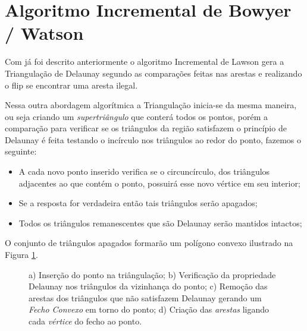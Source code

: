 \documentclass[12pt,a4paper]{book}
\begin{document}
\section{Algoritmo Incremental de Bowyer / Watson}

Com j\'{a} foi descrito anteriormente o algoritmo Incremental de Lawson 
gera a Triangula\c{c}\~{a}o de Delaunay segundo as compara\c{c}\~{o}es 
feitas nas arestas e realizando o flip se encontrar uma aresta ilegal.

Nessa outra abordagem algor\'itmica a Triangula\c{c}\~{a}o inicia-se da mesma maneira, ou seja criando um \textit{supertri\^{a}ngulo} que conter\'{a} todos os pontos, por\'{e}m a compara\c{c}\~{a}o para verificar se os tri\^{a}ngulos da regi\~{a}o satisfazem o princ\'{i}pio de Delaunay \'{e} feita testando o inc\'{i}rculo nos tri\^{a}ngulos ao redor do ponto, fazemos o seguinte: 

\begin{itemize}
\item A cada novo ponto inserido verifica se o circunc\'{i}rculo, dos tri\^{a}ngulos adjacentes
ao que cont\'{e}m o ponto, possuir\'{a} esse novo v\'{e}rtice em seu interior;

\item Se a resposta for verdadeira ent\~{a}o tais tri\^{a}ngulos ser\~{a}o apagados;

\item Todos os tri\^{a}ngulos remanescentes que s\~{a}o Delaunay ser\~{a}o mantidos intactos;
\end{itemize}
O conjunto de tri\^{a}ngulos apagados formar\~{a}o um pol\'{i}gono convexo ilustrado na Figura 
\ref{fig9_chapter6}.

\begin{figure}[htbp]
  \begin{center}
    \leavevmode
    
    \caption{ a) Inser\c{c}\~{a}o do ponto na tri\^{a}ngula\c{c}\~{a}o; 
              b) Verifica\c{c}\~{a}o da propriedade Delaunay nos tri\^{a}ngulos da vizinhan\c{c}a 
              do ponto; c) Remo\c{c}\~{a}o das arestas dos tri\^{a}ngulos que n\~{a}o satisfazem
              Delaunay gerando um \textit{Fecho Convexo} em torno do ponto; d) Cria\c{c}\~{a}o das 
              \textit{arestas} ligando cada \textit{v\'{e}rtice} do fecho ao ponto.}
    \label{fig9_chapter6}
  \end{center}
\end{figure}

\newpage
\end{document}
